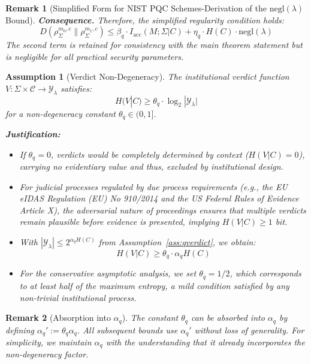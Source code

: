 \documentclass{ieeeaccess}
\newtheorem{remark}{Remark}[section]
\newtheorem{assumption}{Assumption}[section]
\begin{document}
\begin{remark}[Simplified Form for NIST PQC Schemes-Derivation of 
the $\mathrm{negl}(\lambda)$ Bound]
\textbf{Consequence.}
Therefore, the simplified regularity condition holds:
\begin{equation}
    D(\rho_\Sigma^{m_0,c} \| \rho_\Sigma^{m_1,c}) \leq 
    \beta_q \cdot I_{\mathrm{acc}}(M;\Sigma|C) + 
    \eta_q \cdot H(C) \cdot \mathrm{negl}(\lambda)
\end{equation}
The second term is retained for consistency with the main theorem 
statement but is negligible for all practical security parameters.
\end{remark}

\begin{assumption}[Verdict Non-Degeneracy]
\label{ass:nondeg}
The institutional verdict function $V: \Sigma \times \mathcal{C} \to \mathcal{Y}_\lambda$ satisfies:
\begin{equation}
    H(V|C) \geq \theta_q \cdot \log_2 |\mathcal{Y}_\lambda|
\end{equation}
for a non-degeneracy constant $\theta_q \in (0,1]$.

\textbf{Justification:} 
\begin{itemize}
    \item If $\theta_q = 0$, verdicts would be completely determined by context ($H(V|C) = 0$), carrying no evidentiary value and thus,  excluded by institutional design.
    \item For judicial processes regulated by due process requirements (e.g., the EU eIDAS Regulation (EU) No 910/2014 and the US Federal Rules of Evidence Article X), the adversarial nature of proceedings ensures that multiple verdicts remain plausible before evidence is presented, implying $H(V|C) \geq 1$ bit.
    \item With $|\mathcal{Y}_\lambda| \leq 2^{\alpha_q H(C)}$ from Assumption~\ref{ass:qverdict}, we obtain:
    \begin{equation}
        H(V|C) \geq \theta_q \cdot \alpha_q H(C)
    \end{equation}
    \item For the conservative asymptotic analysis, we set $\theta_q = 1/2$, which corresponds to at least half of the maximum entropy,  a mild condition satisfied by any non-trivial institutional process.
\end{itemize}
\end{assumption}

\begin{remark}[Absorption into $\alpha_q$]
The constant $\theta_q$ can be absorbed into $\alpha_q$ by defining $\alpha_q' := \theta_q \alpha_q$. All subsequent bounds use $\alpha_q'$ without loss of generality. For simplicity, we maintain $\alpha_q$ with the understanding that it already incorporates the non-degeneracy factor.
\end{remark}
\end{document}
